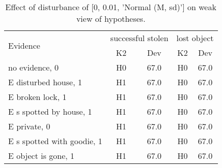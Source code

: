 \begin{table}\begin{tabular}{l|cc|cc}\toprule\multirow{2}{*}{Evidence} & \multicolumn{2}{c}{successful stolen}& \multicolumn{2}{c}{lost object}\\& {K2} & {Dev}& {K2} & {Dev}\\\midrule
no evidence, 0 & \cellcolor{Bittersweet}H0&\cellcolor{Bittersweet}67.0&\cellcolor{Bittersweet}H0&\cellcolor{Bittersweet}67.0\\E disturbed house, 1 & \cellcolor{Bittersweet}H1&\cellcolor{Bittersweet}67.0&\cellcolor{Bittersweet}H0&\cellcolor{Bittersweet}67.0\\E broken lock, 1 & \cellcolor{Bittersweet}H1&\cellcolor{Bittersweet}67.0&\cellcolor{Bittersweet}H0&\cellcolor{Bittersweet}67.0\\E s spotted by house, 1 & \cellcolor{Bittersweet}H1&\cellcolor{Bittersweet}67.0&\cellcolor{Bittersweet}H0&\cellcolor{Bittersweet}67.0\\E private, 0 & \cellcolor{Bittersweet}H1&\cellcolor{Bittersweet}67.0&\cellcolor{Bittersweet}H0&\cellcolor{Bittersweet}67.0\\E s spotted with goodie, 1 & \cellcolor{Bittersweet}H1&\cellcolor{Bittersweet}67.0&\cellcolor{Bittersweet}H0&\cellcolor{Bittersweet}67.0\\E object is gone, 1 & \cellcolor{Bittersweet}H1&\cellcolor{Bittersweet}67.0&\cellcolor{Bittersweet}H0&\cellcolor{Bittersweet}67.0\\\bottomrule\end{tabular}\caption{Effect of disturbance of [0, 0.01, 'Normal (M, sd)'] on weak view of hypotheses.}\end{table}